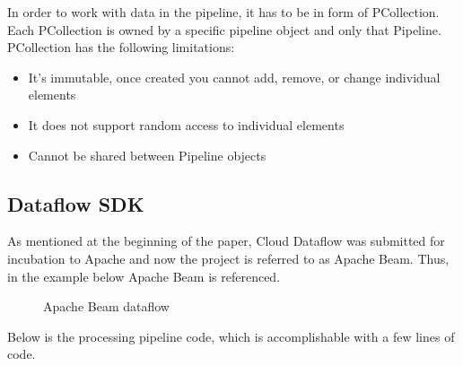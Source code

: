 \documentclass[9pt,twocolumn,twoside]{styles/osajnl}
\begin{document}
In order to work with data in the pipeline, it has to be in form of
PCollection. Each PCollection is owned by a specific pipeline object
and only that Pipeline. PCollection has the following limitations:

\begin{itemize}
  \renewcommand{\labelitemi}{\scriptsize$\square$}
  
\item It’s immutable, once created you cannot add, remove, or change
  individual elements
\item It does not support random access to individual elements
\item Cannot be shared between Pipeline objects

\end{itemize}

\subsection{Dataflow SDK}

As mentioned at the beginning of the paper, Cloud Dataflow was
submitted for incubation to Apache and now the project is referred to
as Apache Beam. Thus, in the example below Apache Beam is referenced.

\begin{figure}[htbp]
\centering {}
\caption{Apache Beam dataflow \cite{www-wordcountflow}}
\label{fig:false-color}
\end{figure}

Below is the processing pipeline code, which is accomplishable with a
few lines of code.
\end{document}
